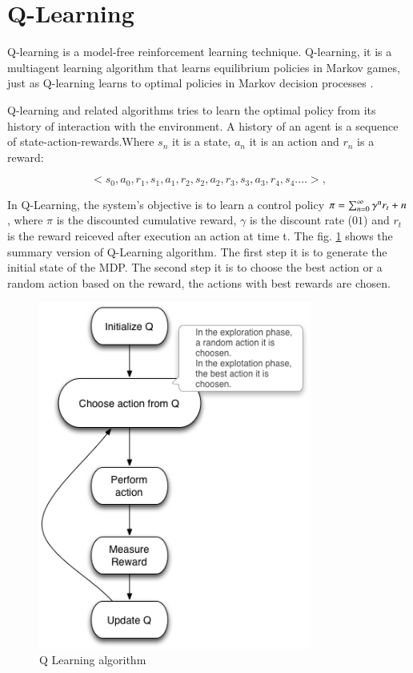 \section{Q-Learning}

Q-learning is a model-free reinforcement learning technique. Q-learning, it is a multiagent learning algorithm that learns equilibrium policies in Markov games, just as Q-learning learns to optimal policies in Markov decision processes \cite{Greenwald2003}. 

Q-learning and related algorithms tries to learn the optimal policy from its history of interaction with the environment. A history of an agent is a sequence of state-action-rewards.Where $s_{n}$ it is a state, $a_{n}$ it is an action and $r_{n}$ is a reward:

\begin{equation}
<s_{0},a_{0},r_{1},s_{1},a_{1},r_{2},s_{2},a_{2},r_{3},s_{3},a_{3},r_{4},s_{4}....>,
\end{equation}


In Q-Learning, the system's objective is to learn a control policy $\pi = \sum_{n=0}^{\infty} \gamma\textsuperscript{n}  r_{t}+n $, where $\pi$  is the discounted cumulative reward, $\gamma$ is the discount rate ($01$) and $r_{t}$ is the reward reiceved after execution an action at time t. The fig. \ref{fig:qalgo} shows the summary version of Q-Learning algorithm. The first step it is to generate the initial state of the MDP. The second step it is to choose the best action or a random action based on the reward, the actions with best rewards are chosen.


\begin{figure}[h!]
\centering
\includegraphics[width=0.8\textwidth]{./images/qalgo.png}
\caption{Q Learning algorithm}
\label{fig:qalgo}
\end{figure}


